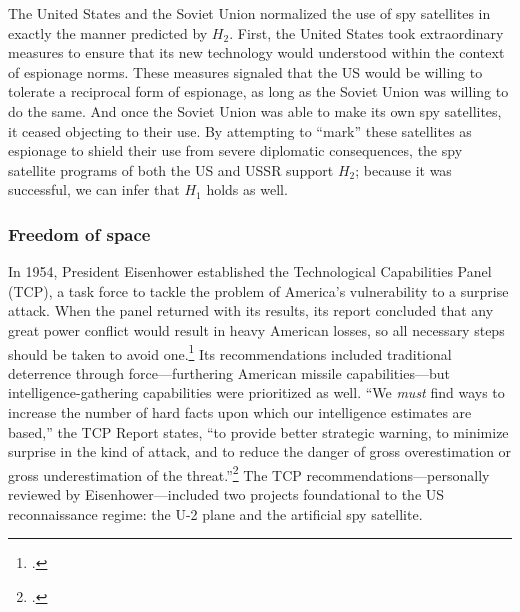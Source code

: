 \documentclass[14pt]{extarticle}
\begin{document}
The United States and the Soviet Union normalized the use of spy satellites in exactly the manner predicted by $H_2$. First, the United States took extraordinary measures to ensure that its new technology would understood within the context of espionage norms. These measures signaled that the US would be willing to tolerate a reciprocal form of espionage, as long as the Soviet Union was willing to do the same. And once the Soviet Union was able to make its own spy satellites, it ceased objecting to their use. By attempting to \enquote{mark} these satellites as espionage to shield their use from severe diplomatic consequences, the spy satellite programs of both the US and USSR support $H_2$; because it was successful, we can infer that $H_1$ holds as well.

\subsubsection{Freedom of space}

In 1954, President Eisenhower established the Technological Capabilities Panel (TCP), a task force to tackle the problem of America's vulnerability to a surprise attack. When the panel returned with its results, its report concluded that any great power conflict would result in heavy American losses, so all necessary steps should be taken to avoid one.\footcite[p.~67. The TCP report is also variously referred to as the \enquote{Killian Report,} \enquote{Surprise Attack Study,} or its formal title, \enquote{Meeting the Threat of a Surprise Attack.}]{killian_sputnik_1977} Its recommendations included traditional deterrence through force---furthering American missile capabilities---but intelligence-gathering capabilities were prioritized as well. ``We \emph{must} find ways to increase the number of hard facts upon which our intelligence estimates are based,'' the TCP Report states, ``to provide better strategic warning, to minimize surprise in the kind of attack, and to reduce the danger of gross overestimation or gross underestimation of the threat.''\footcite{technological_capabilities_panel_meeting_1955} The TCP recommendations---personally reviewed by Eisenhower---included two projects foundational to the US reconnaissance regime: the U-2 plane and the artificial spy satellite.
\end{document}
